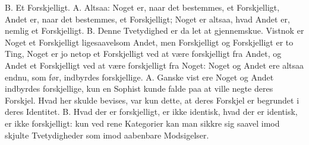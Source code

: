 \documentclass[12pt,a4paper]{book}
\begin{document}
B. Et Forskjelligt. A. Altsaa: Noget er, naar det bestemmes, et
Forskjelligt, Andet er, naar det bestemmes, et Forskjelligt; Noget er
altsaa, hvad Andet er, nemlig et Forskjelligt. B. Denne Tvetydighed er
da let at gjennemskue. Vistnok
er Noget et Forskjelligt ligesaavelsom Andet, men Forskjelligt og
Forskjelligt er to Ting, Noget er jo netop et Forskjelligt ved at være
forskjelligt fra Andet, og Andet et Forskjelligt ved at være
forskjelligt fra Noget: Noget og Andet ere altsaa endnu, som før,
indbyrdes forskjellige. A. Ganske vist ere Noget og Andet indbyrdes
forskjellige, kun en Sophist kunde falde paa at ville negte deres
Forskjel. Hvad her skulde bevises, var kun dette, at deres Forskjel er
begrundet i deres Identitet. B. Hvad der er forskjelligt, er ikke
identisk, hvad der er identisk, er ikke forskjelligt: kun ved rene
Kategorier kan man sikkre sig saavel imod skjulte Tvetydigheder som imod
aabenbare Modsigelser.
\end{document}

